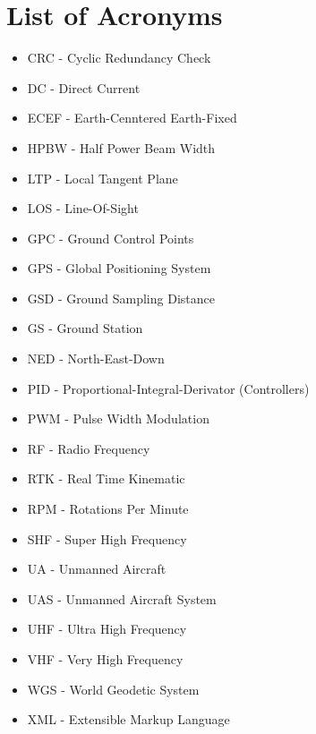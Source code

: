 \section*{List of Acronyms}
\begin{itemize}
	\item CRC - Cyclic Redundancy Check
	\item DC - Direct Current
	\item ECEF - Earth-Cenntered Earth-Fixed
	\item HPBW - Half Power Beam Width
	\item LTP - Local Tangent Plane
	\item LOS - Line-Of-Sight
	\item GPC - Ground Control Points
	\item GPS - Global Positioning System
	\item GSD - Ground Sampling Distance
	\item GS - Ground Station
	\item NED - North-East-Down
	\item PID - Proportional-Integral-Derivator (Controllers)
	\item PWM - Pulse Width Modulation
	\item RF - Radio Frequency
	\item RTK - Real Time Kinematic
	\item RPM - Rotations Per Minute
	\item SHF - Super High Frequency
	\item UA - Unmanned Aircraft
	\item UAS - Unmanned Aircraft System
	\item UHF - Ultra High Frequency
	\item VHF - Very High Frequency
	\item WGS - World Geodetic System
	\item XML - Extensible Markup Language
\end{itemize}